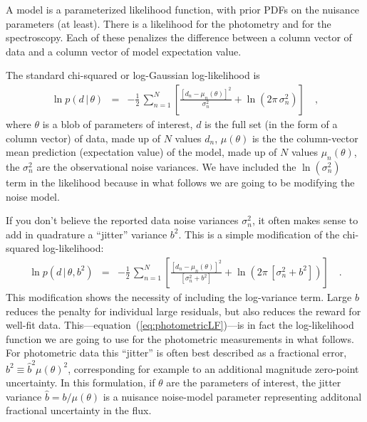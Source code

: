 \documentclass[iop,numberedappendix]{emulateapj}
\newcommand{\given}{\,|\,}
\begin{document}
A model is a parameterized likelihood function, with prior PDFs
on the nuisance parameters (at least).  There is a likelihood for
the photometry and for the spectroscopy.  Each of these penalizes
the difference between a column vector of data and a column vector of
model expectation value.

The standard chi-squared or log-Gaussian log-likelihood is
\begin{eqnarray}
\ln p(d\given\theta) &=& -\frac{1}{2}\,\sum_{n=1}^N \left[\frac{[d_n - \mu_n(\theta)]^2}{\sigma_n^2} + \ln(2\pi\,\sigma_n^2) \right]
\quad ,
\end{eqnarray}
where $\theta$ is a blob of parameters of interest,
$d$ is the full set (in the form of a column vector) of data,
made up of $N$ values $d_n$,
$\mu(\theta)$ is the the column-vector mean prediction (expectation value) of the model,
made up of $N$ values $\mu_n(\theta)$,
the $\sigma_n^2$ are the observational noise variances.
We have included the $\ln(\sigma_n^2)$ term in the likelihood because
in what follows we are going to be modifying the noise model.

If you don't believe the reported data noise variances $\sigma_n^2$,
it often makes sense to add in quadrature a ``jitter'' variance $b^2$.
This is a simple modification of the chi-squared log-likelihood:
\begin{eqnarray}\label{eq:photometricLF}
\ln p(d\given\theta,b^2) &=& -\frac{1}{2}\,\sum_{n=1}^N
                             \left[\frac{[d_n - \mu_n(\theta)]^2}
                             {[\sigma_n^2 + b^2]} + 
                             \ln(2\pi\,[\sigma_n^2 + b^2]) \right]
\quad .
\end{eqnarray}
This modification shows the necessity of including the log-variance
term.  Large $b$ reduces the penalty for individual large residuals,
but also reduces the reward for well-fit data.
This---equation~(\ref{eq:photometricLF})---is in fact the
log-likelihood function we are going to use for the photometric
measurements in what follows.  For photometric data this ``jitter'' is
often best described as a fractional error, $b^2 \equiv
\hat{b}^2\mu(\theta)^2$, corresponding for example to an additional
magnitude zero-point uncertainty.  In this formulation, if $\theta$
are the parameters of interest, the jitter variance $\hat{b} =
b/\mu(\theta)$ is a nuisance noise-model parameter representing
additonal fractional uncertainty in the flux.  
\end{document}
